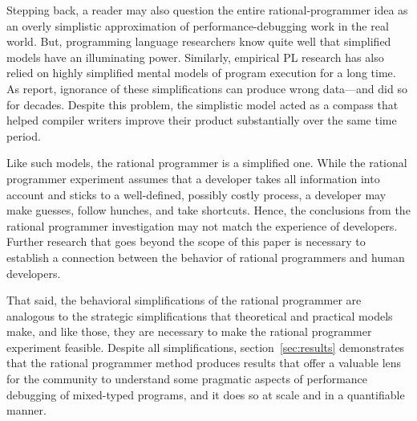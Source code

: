 Stepping back, a reader may also question the entire rational-programmer idea as
an overly simplistic approximation of performance-debugging work in the real
world. But, programming language researchers know quite well that simplified
models have an illuminating power.  Similarly, empirical PL research has also
relied on highly simplified mental models of program execution for a long
time. As \citet{mdhs:wrong-data} report, ignorance of these simplifications can
produce wrong data---and did so for decades. Despite this problem, the simplistic
model acted as a compass that helped compiler writers improve their product
substantially over the same time period.

Like such models, the rational programmer is a simplified one.  While the
rational programmer experiment assumes that a developer takes all
information into account and sticks to a well-defined, possibly costly
process, a developer may make guesses, follow hunches, and take
shortcuts. Hence, the conclusions from the rational programmer
investigation may not match the experience of developers. Further
research that goes beyond the scope of this paper is necessary to
establish a connection between the behavior of rational programmers
and human developers.  

That said, the behavioral simplifications of the rational programmer are
analogous to the strategic simplifications that theoretical and practical models
make, and like those, they are necessary to make the rational programmer
experiment feasible. Despite all simplifications, section~\ref{sec:results}
demonstrates that the rational programmer method produces results that offer a
valuable lens for the community to understand some pragmatic aspects of
performance debugging of mixed-typed programs, and it does so at scale and in a
quantifiable manner.

